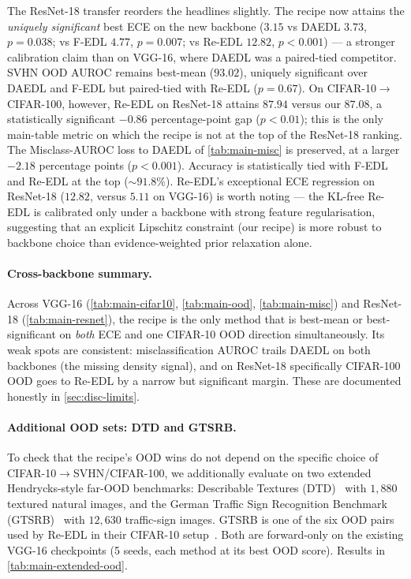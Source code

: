 \documentclass[review,5p,times]{elsarticle}
\begin{document}
The ResNet-18 transfer reorders the headlines slightly. The recipe now
attains the \emph{uniquely significant} best ECE on the new backbone
($3.15$ vs DAEDL $3.73$, $p\!=\!0.038$; vs F-EDL $4.77$, $p\!=\!0.007$;
vs Re-EDL $12.82$, $p\!<\!0.001$) --- a stronger calibration claim than
on VGG-16, where DAEDL was a paired-tied competitor. SVHN OOD AUROC
remains best-mean ($93.02$), uniquely significant over DAEDL and F-EDL
but paired-tied with Re-EDL ($p\!=\!0.67$). On CIFAR-10$\to$CIFAR-100,
however, Re-EDL on ResNet-18 attains $87.94$ versus our $87.08$, a
statistically significant $-0.86$ percentage-point gap ($p\!<\!0.01$);
this is the only main-table metric on which the recipe is not at the
top of the ResNet-18 ranking. The Misclass-AUROC loss to DAEDL of
\autoref{tab:main-misc} is preserved, at a larger $-2.18$ percentage
points ($p\!<\!0.001$). Accuracy is statistically tied with F-EDL and
Re-EDL at the top ($\sim 91.8\%$). Re-EDL's exceptional ECE regression
on ResNet-18 ($12.82$, versus $5.11$ on VGG-16) is worth noting --- the
KL-free Re-EDL is calibrated only under a backbone with strong feature
regularisation, suggesting that an explicit Lipschitz constraint (our
recipe) is more robust to backbone choice than evidence-weighted prior
relaxation alone.

\paragraph{Cross-backbone summary.} Across VGG-16
(\autoref{tab:main-cifar10}, \autoref{tab:main-ood},
\autoref{tab:main-misc}) and ResNet-18 (\autoref{tab:main-resnet}), the
recipe is the only method that is best-mean or best-significant on
\emph{both} ECE and one CIFAR-10 OOD direction simultaneously. Its
weak spots are consistent: misclassification AUROC trails DAEDL on
both backbones (the missing density signal), and on ResNet-18
specifically CIFAR-100 OOD goes to Re-EDL by a narrow but significant
margin. These are documented honestly in \autoref{sec:disc-limits}.

\paragraph{Additional OOD sets: DTD and GTSRB.}
To check that the recipe's OOD wins do not depend on the specific
choice of CIFAR-10$\to$SVHN/CIFAR-100, we additionally evaluate on two
extended Hendrycks-style far-OOD benchmarks: Describable Textures
(DTD)~\citep{cimpoi2014describing} with $1{,}880$ textured natural
images, and the German Traffic Sign Recognition Benchmark
(GTSRB)~\citep{stallkamp2012gtsrb} with $12{,}630$ traffic-sign images.
GTSRB is one of the six OOD pairs used by Re-EDL in their CIFAR-10
setup~\citep{chen2025reedl}. Both are forward-only on the existing
VGG-16 checkpoints (5 seeds, each method at its best OOD score).
Results in \autoref{tab:main-extended-ood}.
\end{document}
